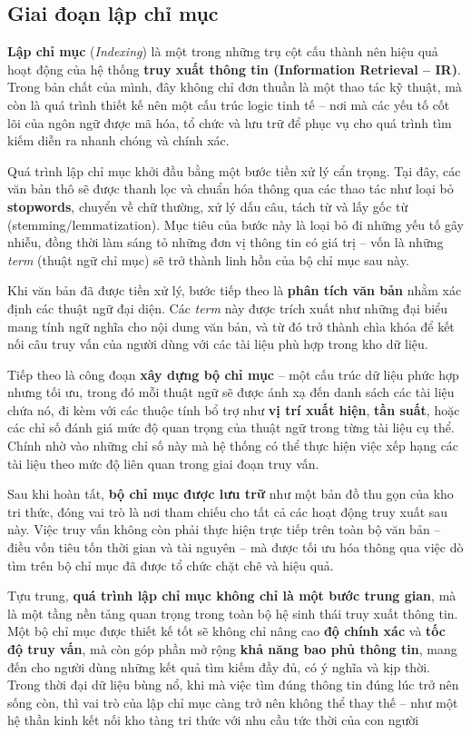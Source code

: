 \subsection{Giai đoạn lập chỉ mục}
\textbf{Lập chỉ mục} (\textit{Indexing}) là một trong những trụ cột cấu thành nên hiệu quả hoạt động của hệ thống \textbf{truy xuất thông tin (Information Retrieval -- IR)}. Trong bản chất của mình, đây không chỉ đơn thuần là một thao tác kỹ thuật, mà còn là quá trình thiết kế nên một cấu trúc logic tinh tế -- nơi mà các yếu tố cốt lõi của ngôn ngữ được mã hóa, tổ chức và lưu trữ để phục vụ cho quá trình tìm kiếm diễn ra nhanh chóng và chính xác.

Quá trình lập chỉ mục khởi đầu bằng một bước tiền xử lý cẩn trọng. Tại đây, các văn bản thô sẽ được thanh lọc và chuẩn hóa thông qua các thao tác như loại bỏ \textbf{stopwords}, chuyển về chữ thường, xử lý dấu câu, tách từ và lấy gốc từ (stemming/lemmatization). Mục tiêu của bước này là loại bỏ đi những yếu tố gây nhiễu, đồng thời làm sáng tỏ những đơn vị thông tin có giá trị -- vốn là những \textit{term} (thuật ngữ chỉ mục) sẽ trở thành linh hồn của bộ chỉ mục sau này.

Khi văn bản đã được tiền xử lý, bước tiếp theo là \textbf{phân tích văn bản} nhằm xác định các thuật ngữ đại diện. Các \textit{term} này được trích xuất như những đại biểu mang tính ngữ nghĩa cho nội dung văn bản, và từ đó trở thành chìa khóa để kết nối câu truy vấn của người dùng với các tài liệu phù hợp trong kho dữ liệu.

Tiếp theo là công đoạn \textbf{xây dựng bộ chỉ mục} -- một cấu trúc dữ liệu phức hợp nhưng tối ưu, trong đó mỗi thuật ngữ sẽ được ánh xạ đến danh sách các tài liệu chứa nó, đi kèm với các thuộc tính bổ trợ như \textbf{vị trí xuất hiện}, \textbf{tần suất}, hoặc các chỉ số đánh giá mức độ quan trọng của thuật ngữ trong từng tài liệu cụ thể. Chính nhờ vào những chỉ số này mà hệ thống có thể thực hiện việc xếp hạng các tài liệu theo mức độ liên quan trong giai đoạn truy vấn.

Sau khi hoàn tất, \textbf{bộ chỉ mục được lưu trữ} như một bản đồ thu gọn của kho tri thức, đóng vai trò là nơi tham chiếu cho tất cả các hoạt động truy xuất sau này. Việc truy vấn không còn phải thực hiện trực tiếp trên toàn bộ văn bản -- điều vốn tiêu tốn thời gian và tài nguyên -- mà được tối ưu hóa thông qua việc dò tìm trên bộ chỉ mục đã được tổ chức chặt chẽ và hiệu quả.

Tựu trung, \textbf{quá trình lập chỉ mục không chỉ là một bước trung gian}, mà là một tầng nền tảng quan trọng trong toàn bộ hệ sinh thái truy xuất thông tin. Một bộ chỉ mục được thiết kế tốt sẽ không chỉ nâng cao \textbf{độ chính xác} và \textbf{tốc độ truy vấn}, mà còn góp phần mở rộng \textbf{khả năng bao phủ thông tin}, mang đến cho người dùng những kết quả tìm kiếm đầy đủ, có ý nghĩa và kịp thời. Trong thời đại dữ liệu bùng nổ, khi mà việc tìm đúng thông tin đúng lúc trở nên sống còn, thì vai trò của lập chỉ mục càng trở nên không thể thay thế -- như một hệ thần kinh kết nối kho tàng tri thức với nhu cầu tức thời của con người
